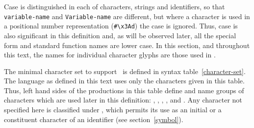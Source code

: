 \label{syntax}
%
\label{character-set}
%
\begin{optDefinition}
%
Case is distinguished in each of characters,
strings and identifiers, so that {\tt variable-name} and {\tt Variable-name} are
different, but where a character is used in a positional number representation
(\eg \verb+#\x3Ad+) the case is ignored.  Thus, case is also significant
in this definition and, as will be observed later, all the special form and
standard function names are lower case.  In this section, and throughout this
text, the names for individual character glyphs are those used in \cite{iso646}.

The minimal character set  to
support \eulisp\ is defined in syntax table~\ref{character-set}.  The language
as defined in this text uses only the characters given in this table.  Thus,
left hand sides of the productions in this table define and name groups of
characters which are used later in this definition: ,
, , ,
 and .  Any character not
specified here is classified under , which permits its
use as an initial or a constituent character of an identifier (see
section~\ref{symbol}).
%
\Syntax
{}
%
\end{optDefinition}
